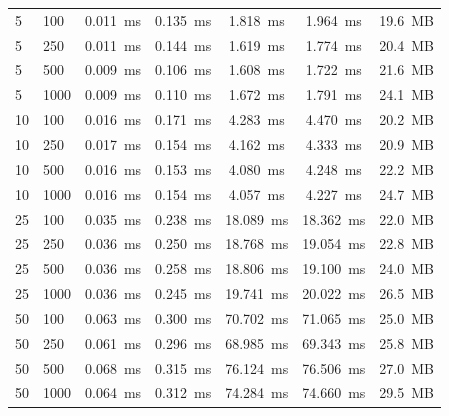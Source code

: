 \begin{table}[!t]
\begin{tabular}{llcccccccc}
\midrule
5 & 100 & \multicolumn{2}{c}{0.011~ms} & \multicolumn{2}{c}{0.135~ms} & \multicolumn{2}{c}{1.818~ms} & 1.964~ms & 19.6~MB \\
5 & 250 & \multicolumn{2}{c}{0.011~ms} & \multicolumn{2}{c}{0.144~ms} & \multicolumn{2}{c}{1.619~ms} & 1.774~ms & 20.4~MB \\
5 & 500 & \multicolumn{2}{c}{0.009~ms} & \multicolumn{2}{c}{0.106~ms} & \multicolumn{2}{c}{1.608~ms} & 1.722~ms & 21.6~MB \\
5 & 1000 & \multicolumn{2}{c}{0.009~ms} & \multicolumn{2}{c}{0.110~ms} & \multicolumn{2}{c}{1.672~ms} & 1.791~ms & 24.1~MB \\
10 & 100 & \multicolumn{2}{c}{0.016~ms} & \multicolumn{2}{c}{0.171~ms} & \multicolumn{2}{c}{4.283~ms} & 4.470~ms & 20.2~MB \\
10 & 250 & \multicolumn{2}{c}{0.017~ms} & \multicolumn{2}{c}{0.154~ms} & \multicolumn{2}{c}{4.162~ms} & 4.333~ms & 20.9~MB \\
10 & 500 & \multicolumn{2}{c}{0.016~ms} & \multicolumn{2}{c}{0.153~ms} & \multicolumn{2}{c}{4.080~ms} & 4.248~ms & 22.2~MB \\
10 & 1000 & \multicolumn{2}{c}{0.016~ms} & \multicolumn{2}{c}{0.154~ms} & \multicolumn{2}{c}{4.057~ms} & 4.227~ms & 24.7~MB \\
25 & 100 & \multicolumn{2}{c}{0.035~ms} & \multicolumn{2}{c}{0.238~ms} & \multicolumn{2}{c}{18.089~ms} & 18.362~ms & 22.0~MB \\
25 & 250 & \multicolumn{2}{c}{0.036~ms} & \multicolumn{2}{c}{0.250~ms} & \multicolumn{2}{c}{18.768~ms} & 19.054~ms & 22.8~MB \\
25 & 500 & \multicolumn{2}{c}{0.036~ms} & \multicolumn{2}{c}{0.258~ms} & \multicolumn{2}{c}{18.806~ms} & 19.100~ms & 24.0~MB \\
25 & 1000 & \multicolumn{2}{c}{0.036~ms} & \multicolumn{2}{c}{0.245~ms} & \multicolumn{2}{c}{19.741~ms} & 20.022~ms & 26.5~MB \\
50 & 100 & \multicolumn{2}{c}{0.063~ms} & \multicolumn{2}{c}{0.300~ms} & \multicolumn{2}{c}{70.702~ms} & 71.065~ms & 25.0~MB \\
50 & 250 & \multicolumn{2}{c}{0.061~ms} & \multicolumn{2}{c}{0.296~ms} & \multicolumn{2}{c}{68.985~ms} & 69.343~ms & 25.8~MB \\
50 & 500 & \multicolumn{2}{c}{0.068~ms} & \multicolumn{2}{c}{0.315~ms} & \multicolumn{2}{c}{76.124~ms} & 76.506~ms & 27.0~MB \\
50 & 1000 & \multicolumn{2}{c}{0.064~ms} & \multicolumn{2}{c}{0.312~ms} & \multicolumn{2}{c}{74.284~ms} & 74.660~ms & 29.5~MB \\

\end{tabular}
\end{table}
